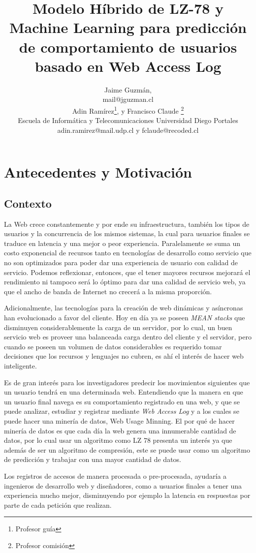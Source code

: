 \documentclass{udparticle}
\title{ Modelo Híbrido de LZ-78 y Machine Learning para predicción de comportamiento de usuarios basado en Web Access Log }
\author{ Jaime Guzmán, \\ {\small mail@jguzman.cl}\protect\\[5pt]%
  {\small Adin Ramírez\thanks{Profesor guía}, y Francisco Claude \thanks{Profesor comisión}} \\
  {\small Escuela de Informática y Telecomunicaciones Universidad Diego Portales} \\
  {\small adin.ramirez@mail.udp.cl y fclaude@recoded.cl }\protect\\[5pt]%
}
\begin{document}
\maketitle
\section{Antecedentes y Motivación}

\subsection{Contexto}

  La Web crece constantemente y por ende su infraestructura, también los tipos de usuarios y la concurrencia de los mismos sistemas, la cual para usuarios finales se traduce en latencia y una mejor o peor experiencia. 
  Paralelamente se suma un costo exponencial de recursos tanto en tecnologías de desarrollo como servicio que no son optimizados para poder dar una experiencia de usuario con calidad de servicio. Podemos reflexionar, entonces, que el  tener mayores recursos mejorará el rendimiento ni tampoco será lo óptimo para dar una calidad de servicio web, ya que el ancho de banda de Internet no crecerá a la misma proporción.
   
  Adicionalmente, las tecnologías para la creación de web dinámicas y asíncronas han evolucionado a favor del cliente.
  Hoy en día ya se poseen \emph{MEAN stacks} que disminuyen considerablemente la carga de un servidor, por lo cual, un buen servicio web es proveer una balanceada carga dentro del cliente y el servidor, pero cuando se poseen un volumen de datos considerables es requerido tomar decisiones que los recursos y lenguajes no cubren, es ahí el interés de hacer  web inteligente.

  Es de gran interés para los investigadores predecir los movimientos siguientes que un usuario tendrá en una determinada web.
  Entendiendo que la manera en que un usuario final navega es su comportamiento registrado en una web, y que se puede analizar, estudiar y registrar mediante \emph{Web Access Log} y a los cuales se puede hacer una minería de datos, Web Usage Minning. El por qué de hacer minería de datos es que cada día la web genera una innumerable cantidad de datos, por lo cual usar un algoritmo como LZ 78 presenta un interés ya que además de ser un algoritmo de compresión, este se puede usar como un algoritmo de predicción y trabajar con una mayor cantidad de datos.
  
  Los registros de accesos de manera procesada o pre-procesada, ayudaría a ingenieros de desarrollo web y diseñadores, como a  usuarios finales a tener una experiencia mucho mejor, disminuyendo por ejemplo la latencia en respuestas por parte de cada petición que realizan.
  
\end{document}
